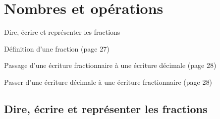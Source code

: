 \documentclass[a4paper,11pt]{report}
\begin{document}
\newcommand{\chapterName}{Nombres et opérations}
\newcommand{\serieName}{Dire, écrire et représenter les fractions}


\chapter*{\chapterName}
\thispagestyle{empty}

\begin{amL}{\serieName}{
\item Définition d'une fraction (page 27)
\item Passage d'une écriture fractionnaire à une écriture décimale (page 28)
\item Passer d'une écriture décimale à une écriture fractionnaire (page 28)
}
\end{amL}
\section*{\serieName}
\setcounter{page}{1}
\thispagestyle{firstPage}



\end{document}
